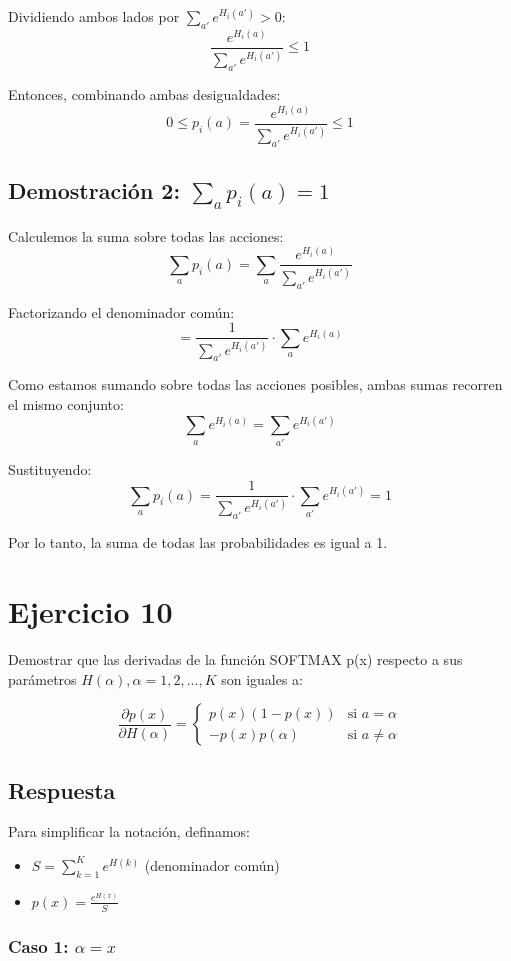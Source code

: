 \documentclass[12pt,a4paper]{article}
\begin{document}
Dividiendo ambos lados por $\sum_{a'} e^{H_i(a')} > 0$:
$$\frac{e^{H_i(a)}}{\sum_{a'} e^{H_i(a')}} \leq 1$$

Entonces, combinando ambas desigualdades:
$$0 \leq p_i(a) = \frac{e^{H_i(a)}}{\sum_{a'} e^{H_i(a')}} \leq 1$$

\subsection{Demostración 2: $\sum_{a} p_i(a) = 1$}

Calculemos la suma sobre todas las acciones:
$$\sum_{a} p_i(a) = \sum_{a} \frac{e^{H_i(a)}}{\sum_{a'} e^{H_i(a')}}$$

Factorizando el denominador común:
$$= \frac{1}{\sum_{a'} e^{H_i(a')}} \cdot \sum_{a} e^{H_i(a)}$$

Como estamos sumando sobre todas las acciones posibles, ambas sumas recorren el mismo conjunto:
$$\sum_{a} e^{H_i(a)} = \sum_{a'} e^{H_i(a')}$$

Sustituyendo:
$$\sum_{a} p_i(a) = \frac{1}{\sum_{a'} e^{H_i(a')}} \cdot \sum_{a'} e^{H_i(a')} = 1$$

Por lo tanto, la suma de todas las probabilidades es igual a 1.

\section{Ejercicio 10}

Demostrar que las derivadas de la función SOFTMAX p(x) respecto a sus parámetros
$H(\alpha), \alpha = 1,2,...,K$ son iguales a:

$$\frac{\partial p(x)}{\partial H(\alpha)} = \begin{cases}
p(x)(1 - p(x)) & \text{si } a = \alpha \\
-p(x)p(\alpha) & \text{si } a \neq \alpha 
\end{cases} $$

\subsection{Respuesta}

Para simplificar la notación, definamos:
\begin{itemize}
    \item $S = \sum_{k=1}^{K} e^{H(k)}$ (denominador común)
    \item $p(x) = \frac{e^{H(x)}}{S}$
\end{itemize}

\subsubsection{Caso 1: $\alpha = x$}
\end{document}
